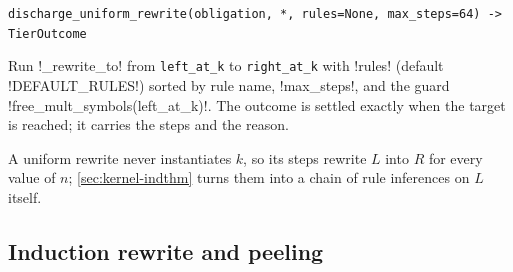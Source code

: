 \begin{signature}
\texttt{discharge\_\allowbreak{}uniform\_\allowbreak{}rewrite(\allowbreak{}obligation,\allowbreak{} *,\allowbreak{} rules=None,\allowbreak{} max\_\allowbreak{}steps=64) -> TierOutcome}

Run \py!_rewrite_to! from \texttt{left\_at\_k} to \texttt{right\_at\_k} with \code!rules! (default \py!DEFAULT_RULES!) sorted by rule name, \code!max_steps!, and the guard \py!free_mult_symbols(left_at_k)!. The outcome is settled exactly when the target is reached; it carries the steps and the reason.
\end{signature}

A uniform rewrite never instantiates $k$, so its steps rewrite $L$ into $R$ for every value of $n$; \cref{sec:kernel-indthm} turns them into a chain of rule inferences on $L$ itself.

\subsection{Induction rewrite and peeling}\label{sec:kernel-tier-peel}

